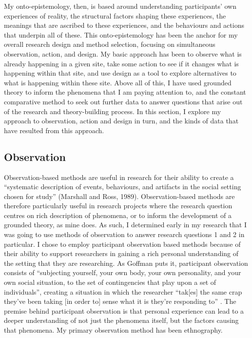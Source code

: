 My onto-epistemology, then, is based around understanding participants' own experiences of reality, the structural factors shaping these experiences, the meanings that are ascribed to these experiences, and the behaviours and actions that underpin all of these. This onto-epistemology has been the anchor for my overall research design and method selection, focusing on simultaneous observation, action, and design. My basic approach has been to observe what is already happening in a given site, take some action to see if it changes what is happening within that site, and use design as a tool to explore alternatives to what is happening within these site. Above all of this, I have used grounded theory to inform the phenomena that I am paying attention to, and the constant comparative method to seek out further data to answer questions that arise out of the research and theory-building process. In this section, I explore my approach to observation, action and design in turn, and the kinds of data that have resulted from this approach. 

\subsection{Observation}
\label{3-observation}

Observation-based methods are useful in research for their ability to create a “systematic description of events, behaviours, and artifacts in the social setting chosen for study” (Marshall and Ross, 1989). Observation-based methods are therefore particularly useful in research projects where the research question centres on rich description of phenomena, or to inform the development of a grounded theory, as mine does. As such, I determined early in my research that I was going to use methods of observation to answer research questions 1 and 2 in particular. I chose to employ participant observation based methods because of their ability to support researchers in gaining a rich personal understanding of the setting that they are researching. As Goffman puts it, participant observation consists of “subjecting yourself, your own body, your own personality, and your own social situation, to the set of contingencies that play upon a set of individuals”, creating a situation in which the researcher “tak[es] the same crap they’ve been taking [in order to] sense what it is they’re responding to”  \citep{goffman_fieldwork_1989}. The premise behind participant observation is that personal experience can lead to a deeper understanding of not just the phenomena itself, but the factors causing that phenomena. My primary observation method has been ethnography. 

